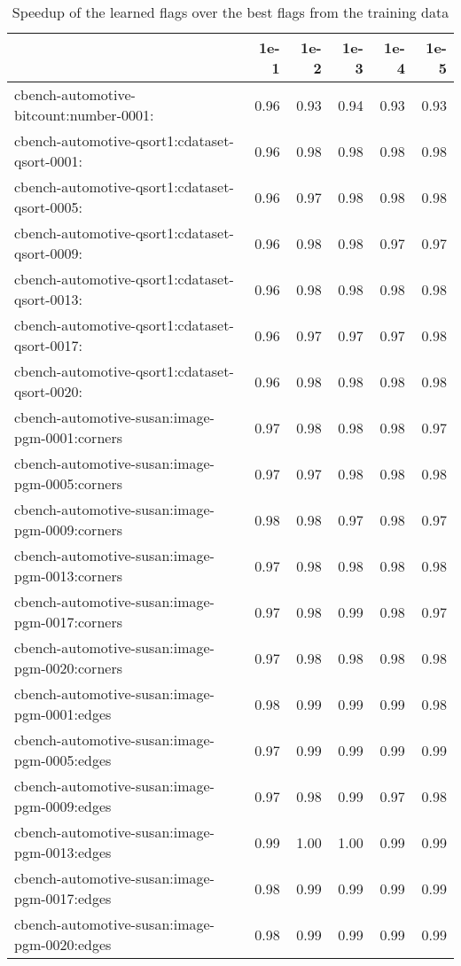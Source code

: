 \begin{table}
\caption{Speedup of the learned flags over the best flags from the training data}
\label{table:validate_score_speedup}
\begin{tabular}{lrrrrr}
\toprule
 & 1e-1 & 1e-2 & 1e-3 & 1e-4 & 1e-5 \\
\midrule
cbench-automotive-bitcount:number-0001: & 0.96 & 0.93 & 0.94 & 0.93 & 0.93 \\
cbench-automotive-qsort1:cdataset-qsort-0001: & 0.96 & 0.98 & 0.98 & 0.98 & 0.98 \\
cbench-automotive-qsort1:cdataset-qsort-0005: & 0.96 & 0.97 & 0.98 & 0.98 & 0.98 \\
cbench-automotive-qsort1:cdataset-qsort-0009: & 0.96 & 0.98 & 0.98 & 0.97 & 0.97 \\
cbench-automotive-qsort1:cdataset-qsort-0013: & 0.96 & 0.98 & 0.98 & 0.98 & 0.98 \\
cbench-automotive-qsort1:cdataset-qsort-0017: & 0.96 & 0.97 & 0.97 & 0.97 & 0.98 \\
cbench-automotive-qsort1:cdataset-qsort-0020: & 0.96 & 0.98 & 0.98 & 0.98 & 0.98 \\
cbench-automotive-susan:image-pgm-0001:corners & 0.97 & 0.98 & 0.98 & 0.98 & 0.97 \\
cbench-automotive-susan:image-pgm-0005:corners & 0.97 & 0.97 & 0.98 & 0.98 & 0.98 \\
cbench-automotive-susan:image-pgm-0009:corners & 0.98 & 0.98 & 0.97 & 0.98 & 0.97 \\
cbench-automotive-susan:image-pgm-0013:corners & 0.97 & 0.98 & 0.98 & 0.98 & 0.98 \\
cbench-automotive-susan:image-pgm-0017:corners & 0.97 & 0.98 & 0.99 & 0.98 & 0.97 \\
cbench-automotive-susan:image-pgm-0020:corners & 0.97 & 0.98 & 0.98 & 0.98 & 0.98 \\
cbench-automotive-susan:image-pgm-0001:edges & 0.98 & 0.99 & 0.99 & 0.99 & 0.98 \\
cbench-automotive-susan:image-pgm-0005:edges & 0.97 & 0.99 & 0.99 & 0.99 & 0.99 \\
cbench-automotive-susan:image-pgm-0009:edges & 0.97 & 0.98 & 0.99 & 0.97 & 0.98 \\
cbench-automotive-susan:image-pgm-0013:edges & 0.99 & 1.00 & 1.00 & 0.99 & 0.99 \\
cbench-automotive-susan:image-pgm-0017:edges & 0.98 & 0.99 & 0.99 & 0.99 & 0.99 \\
cbench-automotive-susan:image-pgm-0020:edges & 0.98 & 0.99 & 0.99 & 0.99 & 0.99 \\

\end{tabular}
\end{table}
